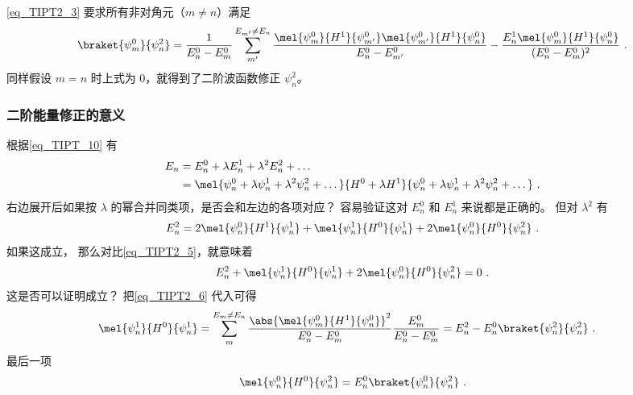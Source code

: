 \autoref{eq_TIPT2_3} 要求所有非对角元（$m\ne n$）满足
\begin{equation} %
\braket{\psi_m^0}{\psi_n^2} =
\frac{1}{E_n^0-E_m^0}\sum_{m'}^{E_{m'}\ne E_n}\frac{\mel{\psi_m^0}{H^1}{\psi_{m'}^0}\mel{\psi_{m'}^0}{H^1}{\psi_n^0}}{E_n^0 - E_{m'}^0} - \frac{E_n^1\mel{\psi_m^0}{H^1}{\psi_n^0}}{(E_n^0 - E_m^0)^2}~.
\end{equation}
同样假设 $m=n$ 时上式为 0，就得到了二阶波函数修正 $\psi_n^2$。

\subsubsection{二阶能量修正的意义}
根据\autoref{eq_TIPT_10} 有
\begin{equation}
\begin{aligned}
E_n &= E_n^0 + \lambda E_n^1 + \lambda^2 E_n^2 + \dots \\
&=\mel{\psi_n^0 + \lambda\psi_n^1 + \lambda^2\psi_n^2 + \dots}{H^0 + \lambda H^1}{\psi_n^0 + \lambda\psi_n^1 + \lambda^2 \psi_n^2 + \dots}~.
\end{aligned}
\end{equation}
右边展开后如果按 $\lambda$ 的幂合并同类项，是否会和左边的各项对应？ 容易验证这对 $E_n^0$ 和 $E_n^1$ 来说都是正确的。 但对 $\lambda^2$ 有
\begin{equation}
E_n^2 = 2\mel{\psi_n^0}{H^1}{\psi_n^1} + \mel{\psi_n^1}{H^0}{\psi_n^1} + 2\mel{\psi_n^0}{H^0}{\psi_n^2}~.
\end{equation}
如果这成立， 那么对比\autoref{eq_TIPT2_5}，就意味着
\begin{equation}
E_n^2 + \mel{\psi_n^1}{H^0}{\psi_n^1} + 2\mel{\psi_n^0}{H^0}{\psi_n^2} = 0~.
\end{equation}
这是否可以证明成立？ 把\autoref{eq_TIPT2_6} 代入可得
\begin{equation}
\begin{aligned}
\mel{\psi_n^1}{H^0}{\psi_n^1} &= \sum_{m}^{E_m\ne E_n} \frac{\abs{\mel{\psi_m^0}{H^1}{\psi_n^0}}^2}{E_n^0 - E_m^0} \frac{E_m^0}{E_n^0 - E_m^0} = E_n^2 - E_n^0\braket{\psi_n^2}{\psi_n^2}~.
\end{aligned}
\end{equation}
最后一项
\begin{equation}
\mel{\psi_n^0}{H^0}{\psi_n^2} = E_n^0 \braket{\psi_n^0}{\psi_n^2}~.
\end{equation}
